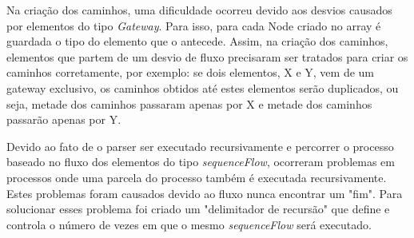 \documentclass[12pt]{article}
\begin{document}
Na criação dos caminhos, uma dificuldade ocorreu devido aos desvios causados por elementos do tipo \emph{Gateway}. Para isso, para cada Node criado no array é guardada o tipo do elemento que o antecede. Assim, na criação dos caminhos, elementos que partem de um desvio de fluxo precisaram ser tratados para criar os caminhos corretamente, por exemplo: se dois elementos, X e Y, vem de um gateway exclusivo, os caminhos obtidos até estes elementos serão duplicados, ou seja, metade dos caminhos passaram apenas por X e metade dos caminhos passarão apenas por Y.


Devido ao fato de o parser ser executado recursivamente e percorrer o processo baseado no fluxo dos elementos do tipo \emph{sequenceFlow}, ocorreram problemas em processos onde uma parcela do processo também é executada recursivamente. Estes problemas foram causados devido ao fluxo nunca encontrar um "fim". Para solucionar esses problema foi criado um "delimitador de recursão" que define e controla o número de vezes em que o mesmo \emph{sequenceFlow} será executado.


\end{document}
